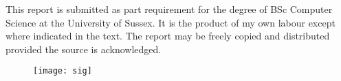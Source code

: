 This report is submitted as part requirement for the degree of BSc Computer Science at the University of Sussex. 
It is the product of my own labour except where indicated in the text. 
The report may be freely copied and distributed provided the source is acknowledged.

\begin{figure}[H]
    \texttt{[image: sig]}
  \end{figure}
